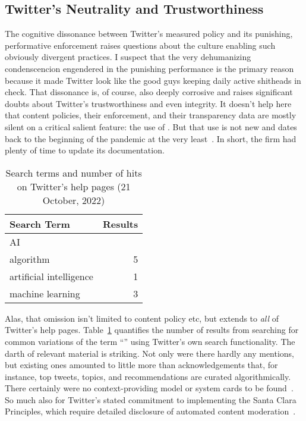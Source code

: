 \subsection{Twitter's Neutrality and Trustworthiness}

The cognitive dissonance between Twitter's measured policy and its punishing,
performative enforcement raises questions about the culture enabling such
obviously divergent practices. I suspect that the very dehumanizing
condenscencion engendered in the punishing performance is the primary reason
because it made Twitter look like the good guys keeping daily active shitheads
in check. That dissonance is, of course, also deeply corrosive and raises
significant doubts about Twitter's trustworthiness and even integrity. It
doesn't help here that content policies, their enforcement, and their
transparency data are mostly silent on a critical salient feature: the use of
\AI. But that use is not new and dates back to the beginning of the pandemic at
the very least~\cite{ScottKayali2020}. In short, the firm had plenty of time to
update its documentation.

\begin{table}
\caption{Search terms and number of hits on Twitter's help pages (21 October, 2022)}
\label{table:search}
\begin{tabular}{lr}
\textbf{Search Term} & \textbf{Results} \B \\ \hline
AI & \T0 \\
algorithm & 5 \\
artificial intelligence & 1 \\
machine learning & 3 \\
\end{tabular}
\end{table}

Alas, that omission isn't limited to content policy etc, but extends to
\emph{all} of Twitter's help pages. Table~\ref{table:search} quantifies the
number of results from searching for common variations of the term ``\AI'' using
Twitter's own search functionality. The darth of relevant material is striking.
Not only were there hardly any mentions, but existing ones amounted to little
more than acknowledgements that, for instance, top tweets, topics, and
recommendations are curated algorithmically. There certainly were no
context-providing model or system cards to be
found~\cite{GreenProcopeea2022,MitchellWuea2019}. So much also for Twitter's
stated commitment to implementing the Santa Clara Principles, which require
detailed disclosure of automated content
moderation~\cite{AccessNowACLUFoundationOfNorthernCaliforniaea2021}.


